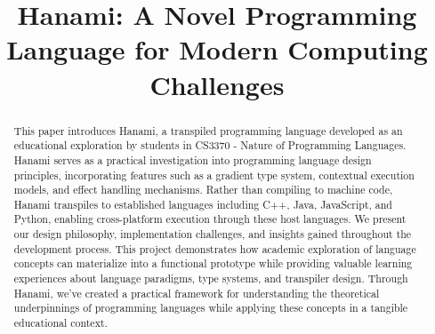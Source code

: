 \documentclass[conference]{IEEEtran}
\begin{document}
\title{Hanami: A Novel Programming Language for Modern Computing Challenges}

\author{
    \and
    \and
    \and
}

\maketitle

\begin{abstract}
    This paper introduces Hanami, a transpiled programming language developed as an educational exploration by students in CS3370 - Nature of Programming Languages. Hanami serves as a practical investigation into programming language design principles, incorporating features such as a gradient type system, contextual execution models, and effect handling mechanisms. Rather than compiling to machine code, Hanami transpiles to established languages including C++, Java, JavaScript, and Python, enabling cross-platform execution through these host languages. We present our design philosophy, implementation challenges, and insights gained throughout the development process. This project demonstrates how academic exploration of language concepts can materialize into a functional prototype while providing valuable learning experiences about language paradigms, type systems, and transpiler design. Through Hanami, we've created a practical framework for understanding the theoretical underpinnings of programming languages while applying these concepts in a tangible educational context.
\end{abstract}
\end{document}
